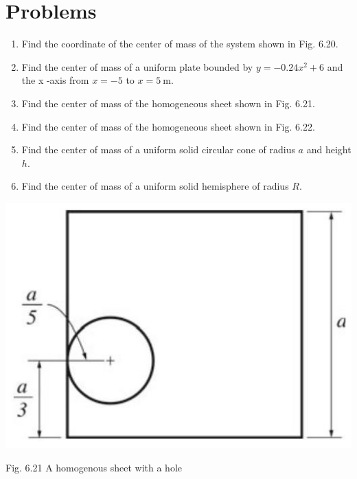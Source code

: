 \documentclass[10pt]{article}
\begin{document}
\section*{Problems}
\begin{enumerate}
  \item Find the coordinate of the center of mass of the system shown in Fig. 6.20.
  \item Find the center of mass of a uniform plate bounded by $y=-0.24 x^{2}+6$ and the x -axis from $x=-5$ to $x=5 \mathrm{~m}$.
  \item Find the center of mass of the homogeneous sheet shown in Fig. 6.21.
  \item Find the center of mass of the homogeneous sheet shown in Fig. 6.22.
  \item Find the center of mass of a uniform solid circular cone of radius $a$ and height $h$.
  \item Find the center of mass of a uniform solid hemisphere of radius $R$.
\end{enumerate}

\begin{center}
\includegraphics[max width=\textwidth]{2024_09_13_db1f357d2aad0a03eb2eg-109}
\end{center}

Fig. 6.21 A homogenous sheet with a hole
\end{document}
